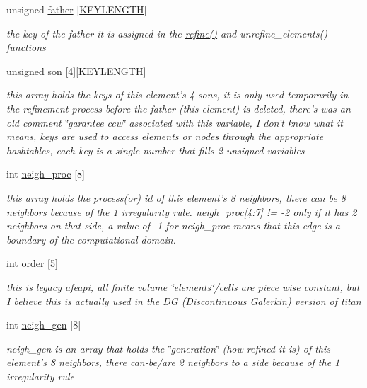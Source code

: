 \begin{CompactItemize}
unsigned \hyperlink{classElement_r9}{father} \mbox{[}\hyperlink{constant_8h_a10}{KEYLENGTH}\mbox{]}
\begin{CompactList}\small\item\em the key of the father it is assigned in the \hyperlink{hadpt_8C_a5}{refine()} and unrefine\_\-elements() functions \item\end{CompactList}\item 
unsigned \hyperlink{classElement_r10}{son} \mbox{[}4\mbox{]}\mbox{[}\hyperlink{constant_8h_a10}{KEYLENGTH}\mbox{]}
\begin{CompactList}\small\item\em this array holds the keys of this element's 4 sons, it is only used temporarily in the refinement process before the father (this element) is deleted, there's was an old comment \char`\"{}garantee ccw\char`\"{} associated with this variable, I don't know what it means, keys are used to access elements or nodes through the appropriate hashtables, each key is a single number that fills 2 unsigned variables \item\end{CompactList}\item 
int \hyperlink{classElement_r11}{neigh\_\-proc} \mbox{[}8\mbox{]}
\begin{CompactList}\small\item\em this array holds the process(or) id of this element's 8 neighbors, there can be 8 neighbors because of the 1 irregularity rule. neigh\_\-proc\mbox{[}4:7\mbox{]} != -2 only if it has 2 neighbors on that side, a value of -1 for neigh\_\-proc means that this edge is a boundary of the computational domain. \item\end{CompactList}\item 
int \hyperlink{classElement_r12}{order} \mbox{[}5\mbox{]}
\begin{CompactList}\small\item\em this is legacy afeapi, all finite volume \char`\"{}elements\char`\"{}/cells are piece wise constant, but I believe this is actually used in the DG (Discontinuous Galerkin) version of titan \item\end{CompactList}\item 
int \hyperlink{classElement_r13}{neigh\_\-gen} \mbox{[}8\mbox{]}
\begin{CompactList}\small\item\em neigh\_\-gen is an array that holds the \char`\"{}generation\char`\"{} (how refined it is) of this element's 8 neighbors, there can-be/are 2 neighbors to a side because of the 1 irregularity rule \item\end{CompactList}\item 

\end{CompactItemize}
